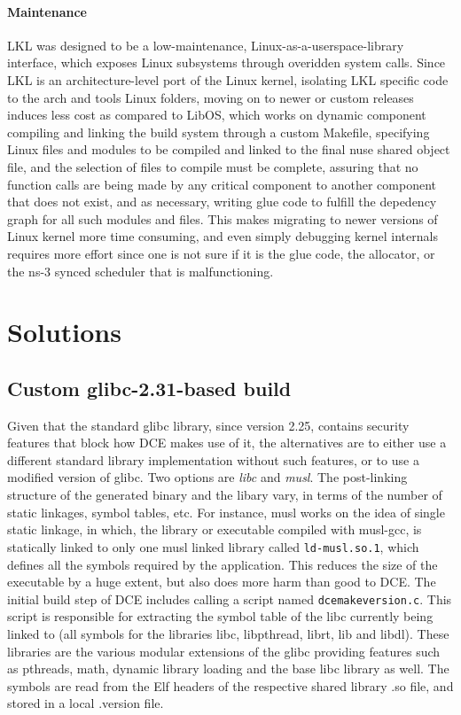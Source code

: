 \documentclass{sig-alternate}
\begin{document}
\paragraph{Maintenance}
LKL was designed to be a low-maintenance, Linux-as-a-userspace-library interface, which exposes Linux subsystems through overidden system calls. 
Since LKL is an architecture-level port of the Linux kernel, isolating LKL specific code to the arch and tools Linux folders, moving on to 
newer or custom releases induces less cost as compared to LibOS, which works on dynamic component compiling and linking the build system through a
custom Makefile, specifying Linux files and modules to be compiled and linked to the final nuse shared object file, and the selection of files to compile must be complete, assuring that no function calls are being made by any critical component to another component that does not 
exist, and as necessary, writing glue code to fulfill the depedency graph for all such modules and files. This makes migrating to newer versions of Linux kernel more time consuming, and 
even simply debugging kernel internals requires more effort since one is not sure if it is the glue code,
the allocator, or the ns-3 synced scheduler that is malfunctioning.

\section{Solutions}
\label{section:design}

\subsection{Custom glibc-2.31-based build}
Given that the standard glibc library, since version 2.25, contains security features that block how DCE makes use of it, the alternatives are to either use a different standard library implementation without such features, or to use a modified version of glibc.  Two options are \textit{libc} and \textit{musl}.
The post-linking structure
of the generated binary and the libary vary, in terms of the number of static linkages, symbol tables, etc. For instance, musl works on the idea of
single static linkage, in which, the library or executable compiled with musl-gcc, is statically linked to only one musl linked library called 
\texttt{ld-musl.so.1}, which defines all the symbols required by the application. This reduces the size of the executable by a huge extent, but 
also does more harm than good to DCE. The initial build step of DCE includes calling a script named \texttt{dcemakeversion.c}. This script is responsible 
for extracting the symbol table of the libc currently being linked to (all symbols for the libraries libc, libpthread, librt, lib and libdl). These 
libraries are the various modular extensions of the glibc providing features such as pthreads, math, dynamic library loading and the base libc 
library as well. The symbols are read from the Elf headers of the respective shared library .so file, and stored in a local .version file.
 
\end{document}
